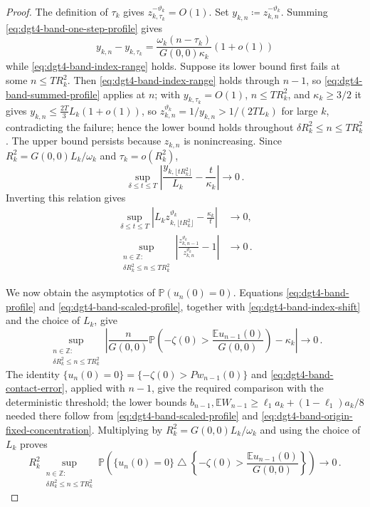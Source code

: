\documentclass[11pt]{amsart}
\theoremstyle{plain}
\theoremstyle{definition}
\newcommand{\Z}{\mathbb{Z}}
\newcommand{\E}{\mathbb{E}}
\renewcommand{\P}{\mathbb{P}}
\begin{document}
\begin{proof}
	The definition of $\tau_k$ gives
	$z_{k,\tau_k}^{-\vartheta_k}=O(1)$. Set
	$y_{k,n}\coloneqq z_{k,n}^{-\vartheta_k}$. Summing
	\eqref{eq:dgt4-band-one-step-profile} gives
		\begin{equation}\label{eq:dgt4-band-summed-profile}
			y_{k,n}-y_{k,\tau_k}=\frac{\omega_k(n-\tau_k)}{G(0,0)\kappa_k}(1+o(1))
		\end{equation}
	while \eqref{eq:dgt4-band-index-range} holds. Suppose its lower bound first fails at some
	$n\leq TR_k^2$. Then \eqref{eq:dgt4-band-index-range} holds through $n-1$, so
	\eqref{eq:dgt4-band-summed-profile} applies at $n$; with $y_{k,\tau_k}=O(1)$,
	$n\leq TR_k^2$, and $\kappa_k\geq3/2$ it gives $y_{k,n}\leq\tfrac{2T}{3}L_k(1+o(1))$, so
	$z_{k,n}^{\vartheta_k}=1/y_{k,n}>1/(2TL_k)$ for large $k$, contradicting the failure; hence
	the lower bound holds throughout $\delta R_k^2\leq n\leq TR_k^2$. The upper bound persists because $z_{k,n}$ is
	nonincreasing. Since
		$R_k^2=G(0,0)L_k/\omega_k$ and $\tau_k=o(R_k^2)$,
		\[
			\sup_{\delta\leq t\leq T}\left|\frac{y_{k,\lfloor tR_k^2\rfloor}}{L_k}-\frac{t}{\kappa_k}\right|\longrightarrow0\, .
		\]
		Inverting this relation gives
		\begin{align}
		\sup_{\delta\leq t\leq T}
		\left|
		L_kz_{k,\lfloor tR_k^2\rfloor}^{\vartheta_k}
		-\frac{\kappa_k}{t}
		\right|
		&\longrightarrow0,
		\label{eq:dgt4-band-scaled-profile}\\
		\sup_{\substack{n\in\Z:\\
		\delta R_k^2\leq n\leq TR_k^2}}
		\left|
		\frac{z_{k,n-1}^{\vartheta_k}}
		{z_{k,n}^{\vartheta_k}}-1
		\right|
		&\longrightarrow0\, .
		\label{eq:dgt4-band-index-shift}
	\end{align}

	We now obtain the asymptotics of $\P(u_n(0)=0)$. Equations
	\eqref{eq:dgt4-band-profile} and
	\eqref{eq:dgt4-band-scaled-profile}, together with
	\eqref{eq:dgt4-band-index-shift} and the choice of $L_k$, give
	\begin{equation}\label{eq:dgt4-band-contact-rate}
		\sup_{\substack{n\in\Z:\\
		\delta R_k^2\leq n\leq TR_k^2}}
		\left|
		\frac{n}{G(0,0)}
		\P\left(
		-\zeta(0)>
		\frac{\E u_{n-1}(0)}{G(0,0)}
		\right)
		-\kappa_k
		\right|
		\longrightarrow0\, .
	\end{equation}
		The identity
		$\{u_n(0)=0\}=\{-\zeta(0)>Pw_{n-1}(0)\}$ and
		\eqref{eq:dgt4-band-contact-error}, applied with $n-1$, give the
		required comparison with the deterministic threshold; the lower bounds
		$b_{n-1},\E W_{n-1}\geq\ell_{1}a_k+(1-\ell_{1})a_k/8$ needed there follow from
		\eqref{eq:dgt4-band-scaled-profile} and \eqref{eq:dgt4-band-origin-fixed-concentration}.
	Multiplying by
	$R_k^2=G(0,0)L_k/\omega_k$ and using the choice of $L_k$ proves
	\begin{equation}\label{eq:dgt4-band-contact-comparison}
		R_k^2
		\sup_{\substack{n\in\Z:\\
		\delta R_k^2\leq n\leq TR_k^2}}
		\P\left(
		\{u_n(0)=0\}
		\mathbin{\triangle}
		\left\{
		-\zeta(0)>
		\frac{\E u_{n-1}(0)}{G(0,0)}
		\right\}
		\right)
		\longrightarrow0\, .
	\end{equation}


\end{proof}
\end{document}
